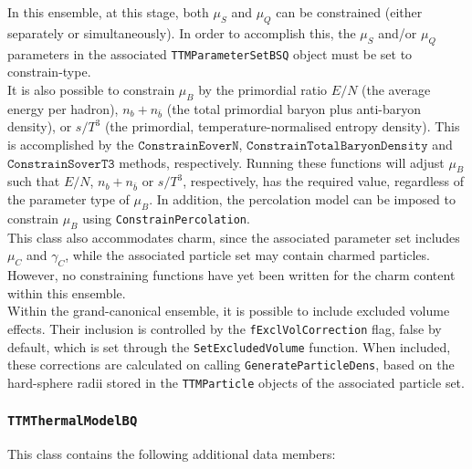 \documentclass{elsarticle}
\begin{document}
In this ensemble, at this stage, both $\mu_S$ and $\mu_Q$ can be constrained (either separately or 
simultaneously). In order to accomplish this, the $\mu_S$ and/or $\mu_Q$ parameters in the associated 
\texttt{TTMParameterSetBSQ} object must be set to constrain-type.\\

It is also possible to constrain $\mu_B$ by the primordial ratio $E/N$ (the average energy per 
hadron), $n_b+n_{\bar{b}}$ (the total primordial baryon plus anti-baryon density), or $s/T^3$ (the 
primordial, temperature-normalised entropy density). 
This is accomplished by the $\texttt{ConstrainEoverN}$, $\texttt{ConstrainTotalBaryonDensity}$ and 
$\texttt{ConstrainSoverT3}$ methods, respectively. Running these functions will adjust $\mu_B$ such 
that $E/N$, $n_b+n_{\bar{b}}$ or $s/T^3$, respectively, has the required value, regardless of the 
parameter type of $\mu_B$. In addition, the percolation model \cite{Magas:2003wi} can be imposed 
to constrain $\mu_B$ using \texttt{ConstrainPercolation}.\\
  
This class also accommodates charm, since the associated parameter set includes 
$\mu_C$ and $\gamma_C$, while the associated particle set may contain charmed particles. However, 
no constraining functions have yet been written for the charm content within this ensemble.\\  

Within the grand-canonical ensemble, it is possible to include excluded volume effects. Their 
inclusion is controlled by 
the \texttt{fExclVolCorrection} flag, false by default, which is set through the 
\texttt{SetExcludedVolume} function. When included, these corrections are calculated on calling 
{\tt GenerateParticleDens}, based on the hard-sphere radii stored in the \texttt{TTMParticle} objects 
of the associated particle set.\\ 

\subsubsection{\texttt{TTMThermalModelBQ}}
This class contains the following additional data members:\\
\end{document}

